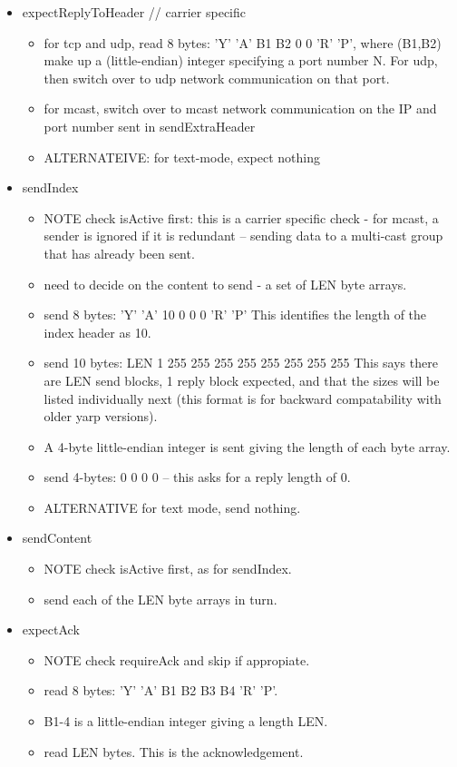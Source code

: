 \documentclass[a4]{article}
\begin{document}
\begin{itemize}
  \item expectReplyToHeader    // carrier specific
    \begin{itemize}
      \item for tcp and udp, read 8 bytes:  'Y' 'A' B1 B2 0 0 'R' 'P', where
	(B1,B2) make up a (little-endian) integer specifying a port number N.
	For udp, then switch over to udp network communication on that port.
      \item for mcast, switch over to mcast network communication on the IP and
	port number sent in sendExtraHeader
      \item ALTERNATEIVE: for text-mode, expect nothing
    \end{itemize}

  \item sendIndex

    \begin{itemize}
    \item NOTE check isActive first: this is a carrier specific check
    - for mcast, a sender is ignored if it is redundant -- sending
    data to a multi-cast group that has already been sent.
    \item need to decide on the content to send - a set of LEN byte arrays.
    \item send 8 bytes: 'Y' 'A' 10 0 0 0 'R' 'P'
      This identifies the length of the index header as 10.
    \item send 10 bytes: LEN 1   255 255 255 255  255 255 255 255
      This says there are LEN send blocks, 1 reply block expected,
      and that the sizes will be listed individually next (this
      format is for backward compatability with older yarp versions).
    \item A 4-byte little-endian integer is sent giving the length of
      each byte array.
    \item send 4-bytes: 0 0 0 0 -- this asks for a reply length of 0.
    \item ALTERNATIVE for text mode, send nothing.
    \end{itemize}

  \item sendContent

    \begin{itemize}
      \item NOTE check isActive first, as for sendIndex.
      \item send each of the LEN byte arrays in turn.
    \end{itemize}

  \item expectAck
    \begin{itemize}
    \item NOTE check requireAck and skip if appropiate.
    \item read 8 bytes: 'Y' 'A' B1 B2 B3 B4 'R' 'P'.
    \item B1-4 is a little-endian integer giving a length LEN.
    \item read LEN bytes.  This is the acknowledgement.
    \end{itemize}
\end{itemize}
\end{document}
